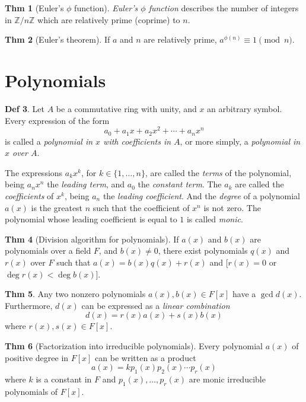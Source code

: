 \documentclass{article}
\theoremstyle{definition}
\newtheorem{definition}{Def}[section]
\newtheorem{theorem}[definition]{Thm}
\begin{document}
\begin{theorem}[Euler's $\phi$ function]
    \emph{Euler's $\phi$ function} describes the number of integers in $\mathbb{Z} / n \mathbb{Z}$ which are relatively prime (coprime) to $n$.
\end{theorem}

\begin{theorem}[Euler's theorem]
    If $a$ and $n$ are relatively prime, $a^{\phi(n)} \equiv 1 \pmod n$.
\end{theorem}


\section{Polynomials}

\begin{definition}
    Let $A$ be a commutative ring with unity, and $x$ an arbitrary symbol. Every expression of the form
    $$a_0 + a_1 x + a_2 x^2 + \cdots + a_n x^n$$
    is called a \emph{polynomial in $x$ with coefficients in $A$}, or more simply, a \emph{polynomial in $x$ over $A$}.
\end{definition}
 The expressions $a_k x^k$, for $k \in \{ 1, \ldots, n \}$, are called the \emph{terms} of the polynomial, being $a_n x^n$ the \emph{leading term}, and $a_0$ the \emph{constant term}.
 The $a_k$ are called the \emph{coefficients} of $x^k$, being $a_n$ the \emph{leading coefficient}. And the \emph{degree} of a polynomial $a(x)$ is the greatest $n$ such that the coefficient of $x^n$ is not zero.
 The polynomial whose leading coefficient is equal to $1$ is called \emph{monic}.

\begin{theorem}[Division algorithm for polynomials]
    If $a(x)$ and $b(x)$ are polynomials over a field $F$, and $b(x) \neq 0$, there exist polynomials $q(x)$ and $r(x)$ over $F$ such that
    $a(x) = b(x) q(x) + r(x)$ and
    [$r(x) = 0$ or $\deg r(x) < \deg b(x)$].
\end{theorem}

\begin{theorem}
    Any two nonzero polynomials $a(x), b(x) \in F[x]$ have a $\gcd d(x)$. Furthermore, $d(x)$ can be expressed as a \emph{linear combination}
    $$d(x)= r(x) a(x) + s(x) b(x)$$
    where $r(x), s(x) \in F[x]$.
\end{theorem}

\begin{theorem}[Factorization into irreducible polynomials]
    Every polynomial $a(x)$ of positive degree in $F[x]$ can be written as a product
    $$a(x) = k p_1(x) p_2(x) \cdots p_r(x)$$
    where $k$ is a constant in $F$ and $p_1(x), \ldots, p_r(x)$ are monic irreducible polynomials of $F[x]$.
\end{theorem}
\end{document}
